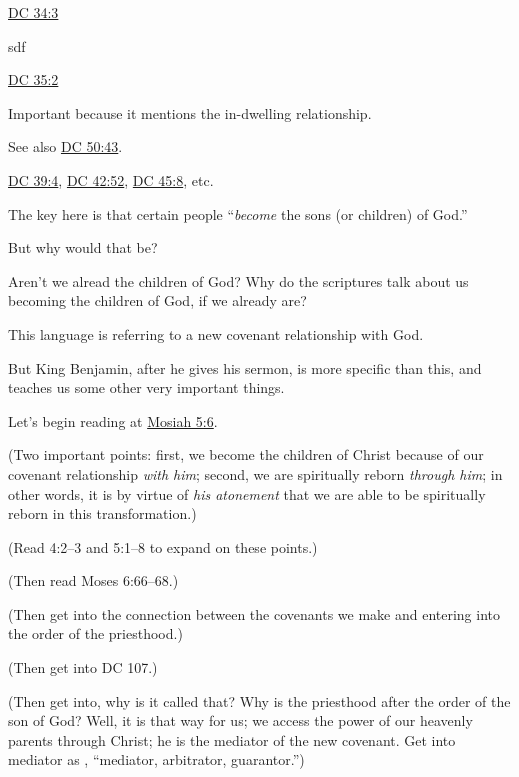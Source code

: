 \begin{compactitem}
\begin{compactitem}
					\item \hyperref[DC34-3]{DC 34:3}
						\begin{compactitem}
							\item sdf
						\end{compactitem}
					\item \hyperref[DC35-2]{DC 35:2}
						\begin{compactitem}
							\item Important because it mentions the in-dwelling relationship.
							\item See also \hyperref[DC50-43]{DC 50:43}.
						\end{compactitem}
					\item \hyperref[DC39-4]{DC 39:4}, \hyperref[DC42-52]{DC 42:52}, \hyperref[DC45-8]{DC 45:8}, etc.
					\item The key here is that certain people ``\textit{become} the sons (or children) of God.''
						\begin{compactitem}
							\item But why would that be?
							\item Aren't we alread the children of God? Why do the scriptures talk about us becoming the children of God, if we already are?
							\item This language is referring to a new covenant relationship with God.
						\end{compactitem}
					\item But King Benjamin, after he gives his sermon, is more specific than this, and teaches us some other very important things.
						\begin{compactitem}
							\item Let's begin reading at \hyperref[MOSIAH-5-6]{Mosiah 5:6}.
							\item (Two important points: first, we become the children of Christ because of our covenant relationship \textit{with him}; second, we are spiritually reborn \textit{through him}; in other words, it is by virtue of \textit{his atonement} that we are able to be spiritually reborn in this transformation.)
							\item (Read 4:2--3 and 5:1--8 to expand on these points.)
							\item (Then read Moses 6:66--68.)
							\item (Then get into the connection between the covenants we make and entering into the order of the priesthood.)
							\item (Then get into DC 107.)
							\item (Then get into, why is it called that? Why is the priesthood after the order of the son of God? Well, it is that way for us; we access the power of our heavenly parents through Christ; he is the mediator of the new covenant. Get into mediator as , ``mediator, arbitrator, guarantor.'')

\end{compactitem}
\end{compactitem}
\end{compactitem}
